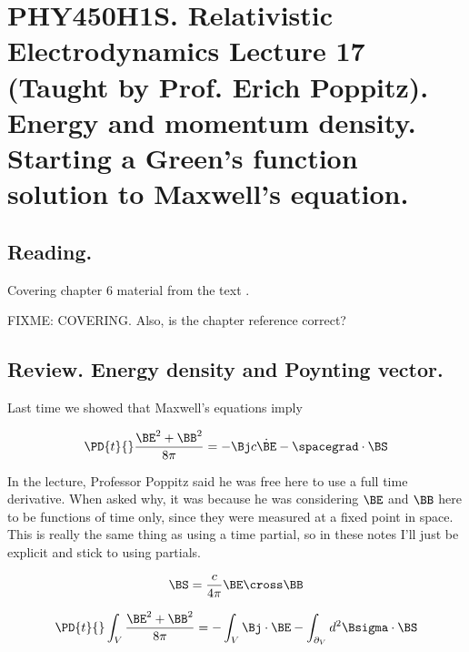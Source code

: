 
%

\chapter{PHY450H1S.  Relativistic Electrodynamics Lecture 17 (Taught by Prof. Erich Poppitz).  Energy and momentum density.  Starting a Green's function solution to Maxwell's equation.}
\label{chap:relativisticElectrodynamicsL17}
{}
\date{Mar 8, 2011}

\beginArtNoToc

\section{Reading.}

Covering chapter 6 material from the text \cite{landau1980classical}.

FIXME: COVERING.  Also, is the chapter reference correct?

\section{Review.  Energy density and Poynting vector.}

Last time we showed that Maxwell's equations imply

\begin{equation}\label{eqn:relativisticElectrodynamicsL17:10}
\PD{t}{} \frac{\BE^2 + \BB^2 }{8 \pi} = -\Bj c\dot \BE - \spacegrad \cdot \BS
\end{equation}

In the lecture, Professor Poppitz said he was free here to use a full time derivative.  When asked why, it was because he was considering $\BE$ and $\BB$ here to be functions of time only, since they were measured at a fixed point in space.  This is really the same thing as using a time partial, so in these notes I'll just be explicit and stick to using partials.

\begin{equation}\label{eqn:relativisticElectrodynamicsL17:30}
\BS = \frac{c}{4 \pi} \BE \cross \BB
\end{equation}

\begin{equation}\label{eqn:relativisticElectrodynamicsL17:50}
\PD{t}{} \int_V \frac{\BE^2 + \BB^2 }{8 \pi} = - \int_V \Bj \cdot \BE - \int_{\partial_V} d^2 \Bsigma \cdot \BS
\end{equation}


